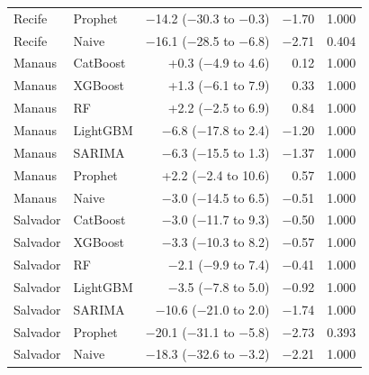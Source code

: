\begin{longtable}{llrrr}
Recife & Prophet & $-$14.2 ($-$30.3 to $-$0.3) & $-$1.70 & 1.000 \\
Recife & Naive & $-$16.1 ($-$28.5 to $-$6.8) & $-$2.71 & 0.404 \\
Manaus & CatBoost & +0.3 ($-$4.9 to 4.6) & 0.12 & 1.000 \\
Manaus & XGBoost & +1.3 ($-$6.1 to 7.9) & 0.33 & 1.000 \\
Manaus & RF & +2.2 ($-$2.5 to 6.9) & 0.84 & 1.000 \\
Manaus & LightGBM & $-$6.8 ($-$17.8 to 2.4) & $-$1.20 & 1.000 \\
Manaus & SARIMA & $-$6.3 ($-$15.5 to 1.3) & $-$1.37 & 1.000 \\
Manaus & Prophet & +2.2 ($-$2.4 to 10.6) & 0.57 & 1.000 \\
Manaus & Naive & $-$3.0 ($-$14.5 to 6.5) & $-$0.51 & 1.000 \\
Salvador & CatBoost & $-$3.0 ($-$11.7 to 9.3) & $-$0.50 & 1.000 \\
Salvador & XGBoost & $-$3.3 ($-$10.3 to 8.2) & $-$0.57 & 1.000 \\
Salvador & RF & $-$2.1 ($-$9.9 to 7.4) & $-$0.41 & 1.000 \\
Salvador & LightGBM & $-$3.5 ($-$7.8 to 5.0) & $-$0.92 & 1.000 \\
Salvador & SARIMA & $-$10.6 ($-$21.0 to 2.0) & $-$1.74 & 1.000 \\
Salvador & Prophet & $-$20.1 ($-$31.1 to $-$5.8) & $-$2.73 & 0.393 \\
Salvador & Naive & $-$18.3 ($-$32.6 to $-$3.2) & $-$2.21 & 1.000 \\
\bottomrule
\end{longtable}
